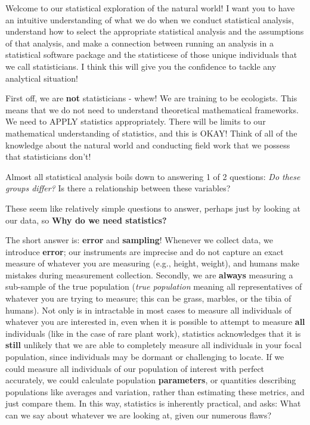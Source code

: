 \documentclass[
]{book}
\begin{document}
Welcome to our statistical exploration of the natural world! I want you to have an intuitive understanding of what we do when we conduct statistical analysis, understand how to select the appropriate statistical analysis and the assumptions of that analysis, and make a connection between running an analysis in a statistical software package and the statisticese of those unique individuals that we call statisticians. I think this will give you the confidence to tackle any analytical situation!

First off, we are \textbf{not} statisticians - whew! We are training to be ecologists. This means that we do not need to understand theoretical mathematical frameworks. We need to APPLY statistics appropriately. There will be limits to our mathematical understanding of statistics, and this is OKAY! Think of all of the knowledge about the natural world and conducting field work that we possess that statisticians don't!

Almost all statistical analysis boils down to answering 1 of 2 questions:
\emph{Do these groups differ?
}Is there a relationship between these variables?

These seem like relatively simple questions to answer, perhaps just by looking at our data, so \textbf{Why do we need statistics?}

The short answer is: \textbf{error} and \textbf{sampling}! Whenever we collect data, we introduce \textbf{error}; our instruments are imprecise and do not capture an exact measure of whatever you are measuring (e.g., height, weight), and humans make mistakes during measurement collection. Secondly, we are \textbf{always} measuring a sub-sample of the true population (\emph{true population} meaning all representatives of whatever you are trying to measure; this can be grass, marbles, or the tibia of humans). Not only is in intractable in most cases to measure all individuals of whatever you are interested in, even when it is possible to attempt to measure \textbf{all} individuals (like in the case of rare plant work), statistics acknowledges that it is \textbf{still} unlikely that we are able to completely measure all individuals in your focal population, since individuals may be dormant or challenging to locate. If we could measure all individuals of our population of interest with perfect accurately, we could calculate population \textbf{parameters}, or quantities describing populations like averages and variation, rather than estimating these metrics, and just compare them. In this way, statistics is inherently practical, and asks: What can we say about whatever we are looking at, given our numerous flaws?
\end{document}

